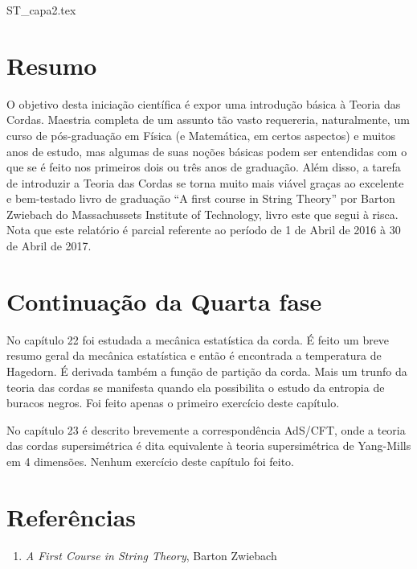 \documentclass[oneside, 12pt]{article}
\begin{document}
{ST_capa2.tex}
 
\pagestyle{mypage2} \normalfont

\section{Resumo}

O objetivo desta iniciação científica é expor uma introdução básica à Teoria das Cordas. Maestria completa de um assunto tão vasto requereria, naturalmente, um curso de pós-graduação em Física (e Matemática, em certos aspectos) e muitos anos de estudo, mas algumas de suas noções básicas podem ser entendidas com o que se é feito nos primeiros dois ou três anos de graduação. Além disso, a tarefa de introduzir a Teoria das Cordas se torna muito mais viável graças ao excelente e bem-testado livro de graduação “A first course in String Theory” por Barton Zwiebach do Massachussets Institute of Technology, livro este que segui à risca. Nota que este relatório é parcial referente ao período de 1 de Abril de 2016 à 30 de Abril de 2017. \par 

\section{Continuação da Quarta fase}

No capítulo 22 foi estudada a mecânica estatística da corda. É feito um breve resumo geral da mecânica estatística e então é encontrada a temperatura de Hagedorn. É derivada também a função de partição da corda. Mais um trunfo da teoria das cordas se manifesta quando ela possibilita o estudo da entropia de buracos negros. Foi feito apenas o primeiro exercício deste capítulo.\par 

No capítulo 23 é descrito brevemente a correspondência AdS/CFT, onde a teoria das cordas supersimétrica é dita equivalente à teoria supersimétrica de Yang-Mills em 4 dimensões. Nenhum exercício deste capítulo foi feito.\par 

\section*{Referências}

\begin{enumerate}
    \item \textit{A First Course in String Theory}, Barton Zwiebach
\end{enumerate}




\end{document}
